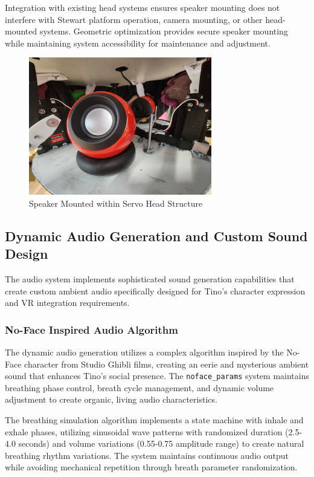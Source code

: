 Integration with existing head systems ensures speaker mounting does not interfere with Stewart platform operation, camera mounting, or other head-mounted systems. Geometric optimization provides secure speaker mounting while maintaining system accessibility for maintenance and adjustment.
\begin{figure}[H]
    \centering
    \includegraphics[height=6cm]{Images/SpeakerSetup (2).jpg}
    \caption{Speaker Mounted within Servo Head Structure}
    \label{fig:speaker_mount}
\end{figure}

\subsection{Dynamic Audio Generation and Custom Sound Design}

The audio system implements sophisticated sound generation capabilities that create custom ambient audio specifically designed for Tino's character expression and VR integration requirements.

\subsubsection{No-Face Inspired Audio Algorithm}

The dynamic audio generation utilizes a complex algorithm inspired by the No-Face character from Studio Ghibli films, creating an eerie and mysterious ambient sound that enhances Tino's social presence. The \texttt{noface\_params} system maintains breathing phase control, breath cycle management, and dynamic volume adjustment to create organic, living audio characteristics.

The breathing simulation algorithm implements a state machine with inhale and exhale phases, utilizing sinusoidal wave patterns with randomized duration (2.5-4.0 seconds) and volume variations (0.55-0.75 amplitude range) to create natural breathing rhythm variations. The system maintains continuous audio output while avoiding mechanical repetition through breath parameter randomization.

